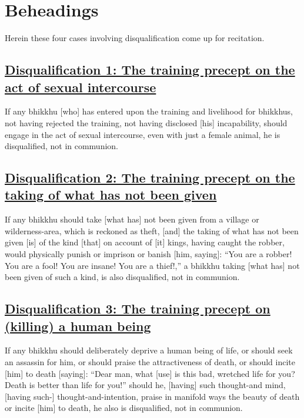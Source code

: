 
\section{Beheadings}
\label{beheadings}

\begin{intro}
	Herein these four cases involving disqualification come up for recitation.
\end{intro}

\setsubsecheadstyle{\subsubsectionFmt}
\subsection*{\hyperref[par1]{Disqualification 1: The training precept on the act of sexual intercourse}}
\label{disq1}

If any bhikkhu [who] has entered upon the training and livelihood for bhikkhus, not having rejected the training, not having disclosed [his] incapability, should engage in the act of sexual intercourse, even with just a female animal, he is disqualified, not in communion.



\subsection*{\hyperref[par2]{Disqualification 2: The training precept on the taking of what has not been given}}
\label{disq2}

If any bhikkhu should take [what has] not been given from a village or wilderness-area, which is reckoned as theft, [and] the taking of what has not been given [is] of the kind [that] on account of [it] kings, having caught the robber, would physically punish or imprison or banish [him, saying]: ``You are a robber! You are a fool! You are insane! You are a thief!,'' a bhikkhu taking [what has] not been given of such a kind, is also disqualified, not in communion.



\subsection*{\hyperref[par3]{Disqualification 3: The training precept on (killing) a human being}}
\label{disq3}

If any bhikkhu should deliberately deprive a human being of life, or should seek an assassin for him, or should praise the attractiveness of death, or should incite [him] to death [saying]: ``Dear man, what [use] is this bad, wretched life for you? Death is better than life for you!'' should he, [having] such thought-and mind, [having such-] thought-and-intention, praise in manifold ways the beauty of death or incite [him] to death, he also is disqualified, not in communion.



